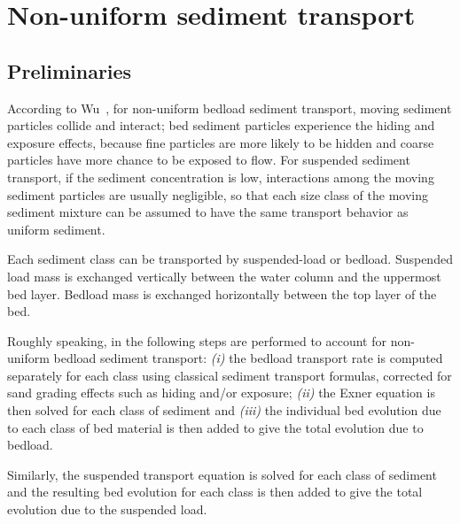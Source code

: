 \chapter[Non-uniform sediment transport]{Non-uniform sediment transport}

\section{Preliminaries}
According to Wu~\cite{wu2007computational}, for non-uniform bedload sediment transport, moving sediment particles collide and interact; bed sediment particles experience the hiding and exposure effects, because fine particles are more likely to be hidden and coarse particles have more chance to be
exposed to flow. For suspended sediment transport, if the sediment concentration is low, interactions among the moving sediment particles are usually negligible, so that each size class of the moving
sediment mixture can be assumed to have the same transport behavior as uniform
sediment.

Each sediment class can be transported by suspended-load or bedload. Suspended load mass is exchanged vertically between the water column and the uppermost bed layer. Bedload mass is exchanged horizontally between the top layer of the bed.

Roughly speaking, in \sisyphe{} the following steps are performed to account for non-uniform bedload sediment transport: \emph{(i)} the bedload transport rate is computed separately for each class using
classical sediment transport formulas, corrected for sand grading effects such as hiding and/or exposure; \emph{(ii)} the Exner equation is then solved for each class of sediment and \emph{(iii)} the individual bed evolution due to each class of bed material is then added to give the total evolution due to bedload.

Similarly, the suspended transport equation is solved for each class of sediment and the resulting bed evolution for each class is then added to give the total evolution due to the suspended load.

